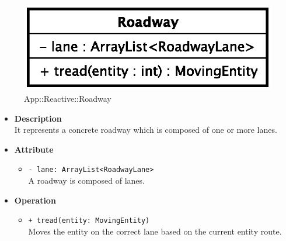 \begin{figure}[h]
\centering
\includegraphics[scale=0.6,keepaspectratio]{images/solution/roadway.eps}
\caption{App::Reactive::Roadway}
\label{fig:sd-app-roadway}
\end{figure}
\FloatBarrier
\begin{itemize}
  \item \textbf{Description} \\
    It represents a concrete roadway which is composed of one or more lanes.
  \item \textbf{Attribute}
  \begin{itemize}
    \item \texttt{- lane: ArrayList<RoadwayLane>} \\
A roadway is composed of lanes.
  \end{itemize}
  \item \textbf{Operation}
  \begin{itemize} 
    \item \texttt{+ tread(entity: MovingEntity)} \\
Moves the entity on the correct lane based on the current entity route. 
  \end{itemize}
\end{itemize}
